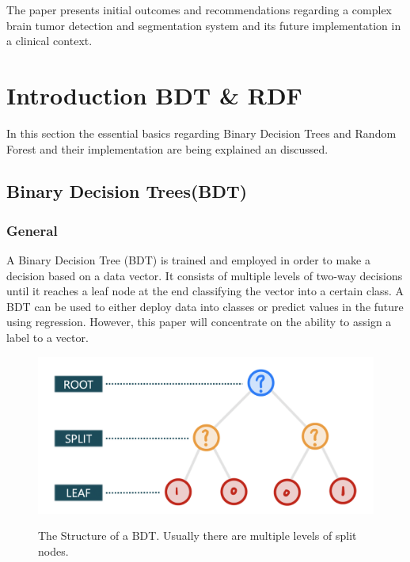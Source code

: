 \documentclass[
12pt,
headsepline,
bibliography=totoc,
twoside=semi,
fleqn
]{scrartcl}
\begin{document}
The paper presents initial outcomes and recommendations regarding a complex brain tumor detection and segmentation system and its future implementation in a clinical context.

\newpage

\section{Introduction BDT \& RDF\label{sec:sec2}}
In this section the essential basics regarding Binary Decision Trees and Random Forest and their implementation are being explained an discussed.

  \subsection{Binary Decision Trees(BDT)\label{sec:sec2-1}}

    \subsubsection{General\label{sec:sec2-1-1}}
      A Binary Decision Tree (BDT) is trained and employed in order to make a decision based on a data vector. It consists of multiple levels of two-way decisions until it reaches a leaf node at the end classifying the vector into a certain class. A BDT can be used to either deploy data into classes or predict values in the future using regression. However, this paper will concentrate on the ability to assign a label to a vector. 

      \begin{figure}[H]
        \centering \includegraphics[scale=0.55]{BDT1.png}\label{fig:fig1}
        \caption{The Structure of a BDT. Usually there are multiple levels of split nodes.}
      \end{figure}
\end{document}
